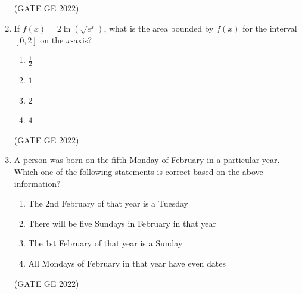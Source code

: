 \documentclass[a4paper, 11pt]{article}
\begin{document}
\begin{enumerate}
\hfill (GATE GE 2022)

\item If $f(x) = 2 \ln(\sqrt{e^x})$, what is the area bounded by $f(x)$ for the interval $[0, 2]$ on the $x$-axis?
\begin{enumerate}
    \item $\frac{1}{2}$
    \item $1$
    \item $2$
    \item $4$
\end{enumerate}

\hfill (GATE GE 2022)

\item A person was born on the fifth Monday of February in a particular year. Which one of the following statements is correct based on the above information?
\begin{enumerate}
    \item The 2nd February of that year is a Tuesday
    \item There will be five Sundays in February in that year
    \item The 1st February of that year is a Sunday
    \item All Mondays of February in that year have even dates
\end{enumerate}

\hfill (GATE GE 2022)


\end{enumerate}
\end{document}
